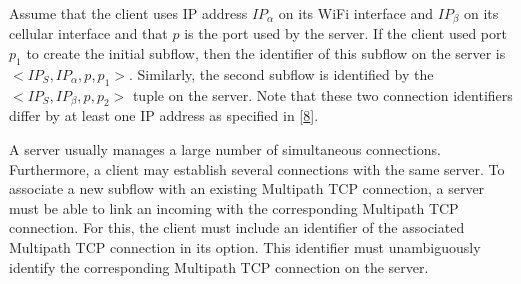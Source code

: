 \documentclass[letterpaper,10pt,english]{sphinxmanual}
\begin{document}
\sphinxAtStartPar
Assume that the client uses IP address \(IP_{\alpha}\) on its Wi\sphinxhyphen{}Fi interface and \(IP_{\beta}\) on its cellular interface and that \(p\) is the port used by the server. If the client used port \(p_1\) to create the initial subflow, then the identifier of this subflow on the server is \(<IP_{S},IP_{\alpha},p,p_{1}>\). Similarly, the second subflow is identified by the \(<IP_{S},IP_{\beta},p,p_{2}>\) tuple on the server. Note that these two connection identifiers differ by at least one IP address as specified in {[}\hyperlink{cite.biblio:id6033}{8}{]}.

\sphinxAtStartPar
A server usually manages a large number of simultaneous connections. Furthermore, a client may establish several connections with the same server. To associate a new subflow with an existing Multipath TCP connection, a server must be able to link an incoming  with the corresponding Multipath TCP connection. For this, the client must include an identifier of the associated Multipath TCP connection in its  option. This identifier must unambiguously identify the corresponding Multipath TCP connection on the server.
\end{document}
